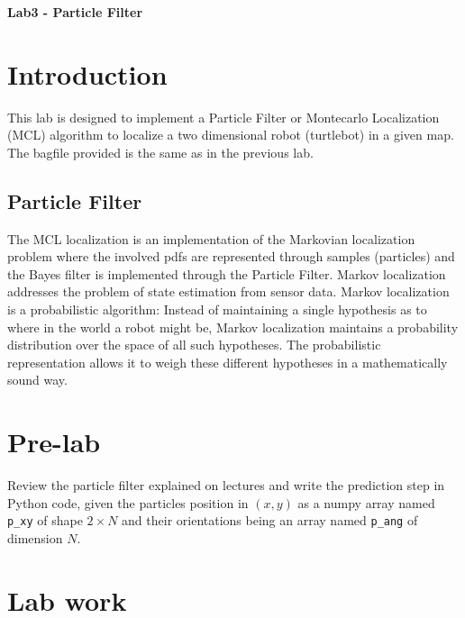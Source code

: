 \documentclass[a4paper,10pt]{article}
\begin{document}
\marginsize{2cm}{2cm}{2cm}{2cm}

\begin{center}
\Large \textbf{Lab3 - Particle Filter}
\end{center}

\section{Introduction}

This lab is designed to implement a Particle Filter or Montecarlo Localization (MCL) algorithm to localize a two dimensional robot (turtlebot) in a given map. The bagfile provided is the same as in the previous lab.

\subsection{Particle Filter}

The MCL localization is an implementation of the Markovian localization problem where the involved pdfs are represented through samples (particles) and the Bayes filter is implemented through the Particle Filter. Markov localization addresses the problem of state estimation from sensor data. Markov localization is a probabilistic algorithm: Instead of maintaining a single hypothesis as to where in the world a robot might be, Markov localization maintains a probability distribution over the space of all such hypotheses. The probabilistic representation allows it to weigh these different hypotheses in a mathematically sound way.

\section{Pre-lab}

Review the particle filter explained on lectures and write the prediction step in Python code, given the particles position in $(x,y)$ as a numpy array named \texttt{p\_xy} of shape $2 \times N$ and their orientations being an array named \texttt{p\_ang} of dimension $N$.

\section{Lab work}
\end{document}
